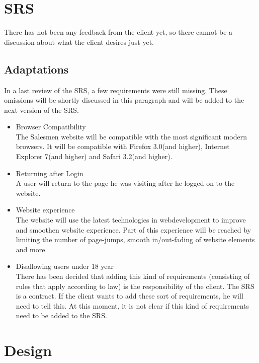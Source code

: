 \documentclass[a4paper, 12pt]{article}
\begin{document}
	\section{SRS}
There has not been any feedback from the client yet, so there cannot be a discussion about what the client desires just yet.
		\subsection{Adaptations}
In a last review of the SRS, a few requirements were still missing. These omissions will be shortly discussed in this paragraph and will be added to the next version of the SRS.
			\begin{itemize}
				\item Browser Compatibility\\
The Salesmen website will be compatible with the most significant modern browsers. It will be compatible with Firefox 3.0(and higher), Internet Explorer 7(and higher) and Safari 3.2(and higher). 
				\item Returning after Login \\
A user will return to the page he was visiting after he logged on to the website. 
				\item Website experience \\
				The website will use the latest technologies in webdevelopment to
				improve and smoothen website experience. Part of this experience will
				be reached by limiting the number of page-jumps, smooth in/out-fading
				of website elements and more.
				\item Disallowing users under 18 year \\
There has been decided that adding this kind of requirements (consisting of rules that apply according to law) is the responsibility of the client. The SRS is a contract. If the client wants to add these sort of requirements, he will need to tell this. At this moment, it is not clear if this kind of requirements need to be added to the SRS. 
			\end{itemize}

	\section{Design}
\end{document}
